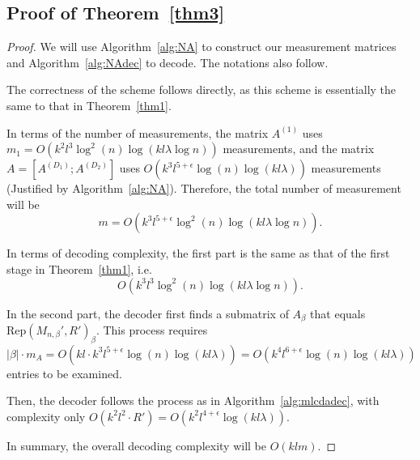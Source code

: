 \documentclass{article}
\begin{document}
\subsection{Proof of Theorem~\ref{thm3}}
\begin{proof}
    We will use Algorithm~\ref{alg:NA} to construct our measurement matrices and Algorithm~\ref{alg:NAdec} to decode. The notations also follow. 

    The correctness of the scheme follows directly, as this scheme is essentially the same to that in Theorem~\ref{thm1}.

    In terms of the number of measurements, the matrix $A^{(1)}$ uses $m_1=O(k^2l^3\log^2(n)\log(kl\lambda\log n))$ measurements, and the matrix $A=[A^{(D_1)};A^{(D_2)}]$ uses $O(k^3l^{5+\epsilon}\log(n)\log(kl\lambda))$ measurements (Justified by Algorithm~\ref{alg:NA}). Therefore, the total number of measurement will be \[m=O(k^3l^{5+\epsilon}\log^2(n)\log(kl\lambda\log n)). \]

    In terms of decoding complexity, the first part is the same as that of the first stage in Theorem~\ref{thm1}, i.e. 
    \[O(k^3l^3\log^2(n)\log(kl\lambda\log n)).\]

    In the second part, the decoder first finds a submatrix of $A_\beta$ that equals $\mathrm{Rep}(M_{n,\beta}',R')_\beta$. This process requires 
    \[|\beta|\cdot m_A=O(kl\cdot k^3l^{5+\epsilon}\log(n)\log(kl\lambda))=O(k^4l^{6+\epsilon}\log(n)\log(kl\lambda))\]
    entries to be examined. 
    

    Then, the decoder follows the process as in Algorithm~\ref{alg:mlcdadec}, with complexity only $O(k^2l^2\cdot R')=O(k^2l^{4+\epsilon}\log(kl\lambda))$. 

    In summary, the overall decoding complexity will be 
    \(O(klm)\).
\end{proof}
\end{document}
